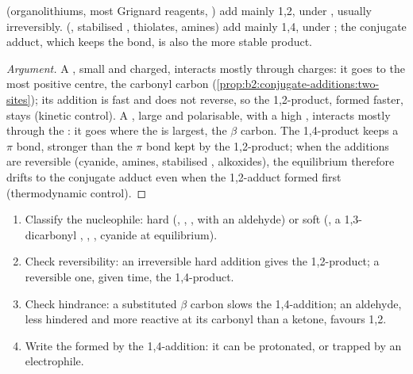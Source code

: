 \begin{proposition}\label{prop:b2:conjugate-additions:regio}
 (organolithiums, most Grignard reagents, ) add mainly 1,2, under , usually irreversibly.  (, stabilised , thiolates,
amines) add mainly 1,4, under ; the conjugate adduct, which keeps the  bond, is
also the more stable product.
\end{proposition}

\begin{proof}[Argument]
A , small and charged, interacts mostly through charges: it goes to the most positive
centre, the carbonyl carbon (\cref{prop:b2:conjugate-additions:two-sites}); its addition is fast and
does not reverse, so the 1,2-product, formed faster, stays (kinetic control). A ,
large and polarisable, with a high , interacts mostly through the : it goes where
the  is largest, the $\beta$ carbon. The 1,4-product keeps a  $\pi$ bond, stronger than the
 $\pi$ bond kept by the 1,2-product; when the additions are reversible (cyanide, amines,
stabilised , alkoxides), the equilibrium therefore drifts to the conjugate adduct even when the
1,2-adduct formed first (thermodynamic control).
\end{proof}

\begin{method}\label{met:b2:conjugate-additions:predict-mode}
\begin{enumerate}
  \item Classify the nucleophile: hard (, , ,  with an aldehyde)
        or soft (, a 1,3-dicarbonyl , , , cyanide at equilibrium).
  \item Check reversibility: an irreversible hard addition gives the 1,2-product; a reversible one,
        given time, the 1,4-product.
  \item Check hindrance: a substituted $\beta$ carbon slows the 1,4-addition; an aldehyde, less hindered
        and more reactive at its carbonyl than a ketone, favours 1,2.
  \item Write the  formed by the 1,4-addition: it can be protonated, or trapped by an
        electrophile.
\end{enumerate}
\end{method}

